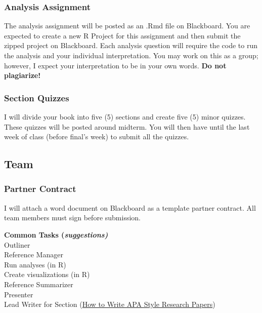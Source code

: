 \documentclass[
  b5paper]{book}
\begin{document}
\hypertarget{analysis-assignment}{%
\subsubsection*{Analysis Assignment}\label{analysis-assignment}}

The analysis assignment will be posted as an .Rmd file on Blackboard. You are expected to create a new R Project for this assignment and then submit the zipped project on Blackboard. Each analysis question will require the code to run the analysis and your individual interpretation. You may work on this as a group; however, I expect your interpretation to be in your own words. \textbf{Do not plagiarize!}

\hypertarget{section-quizzes}{%
\subsubsection*{Section Quizzes}\label{section-quizzes}}

I will divide your book into five (5) sections and create five (5) minor quizzes. These quizzes will be posted around midterm. You will then have until the last week of class (before final's week) to submit all the quizzes.

\hypertarget{team}{%
\subsection*{Team}\label{team}}

\hypertarget{partner-contract}{%
\subsubsection*{Partner Contract}\label{partner-contract}}

I will attach a word document on Blackboard as a template partner contract. All team members must sign before submission.

\textbf{Common Tasks (\emph{suggestions)}\\
}Outliner\\
Reference Manager\\
Run analyses (in R)\\
Create visualizations (in R)\\
Reference Summarizer\\
Presenter\\
Lead Writer for Section (\href{https://psychology.ucsd.edu/_files/undergrad/writingresearchpapersinapastyleguide.pdf}{How to Write APA Style Research Papers})
\end{document}
